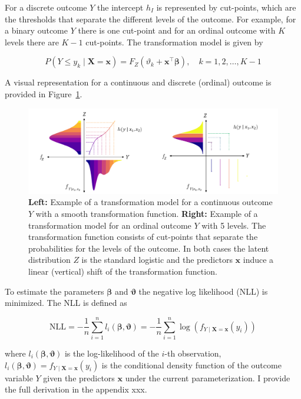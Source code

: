 For a discrete outcome $Y$ the intercept $h_I$ is represented by cut-points, which are the thresholds that separate the different levels of the outcome. For example, for a binary outcome $Y$ there is one cut-point and for an ordinal outcome with $K$ levels there are $K-1$ cut-points. The transformation model is given by

\begin{equation}
P(Y \leq y_k \mid \mathbf{X} = \mathbf{x}) = F_Z(\vartheta_k + \mathbf{x}^\top \boldsymbol{\beta}), \quad k = 1, 2, \ldots, K - 1
\end{equation}


A visual representation for a continuous and discrete (ordinal) outcome is provided in Figure~\ref{fig:tram_cont_ord}.


\begin{figure}[H]
\centering
\includegraphics[width=1\textwidth]{img/tram_cont_ord.png}
\caption{\textbf{Left:} Example of a transformation model for a continuous outcome $Y$ with a smooth transformation function. \textbf{Right:} Example of a transformation model for an ordinal outcome $Y$ with 5 levels. The transformation function consists of cut-points that separate the probabilities for the levels of the outcome.
In both cases the latent distribution $Z$ is the standard logistic and the predictors $\mathbf{x}$ induce a linear (vertical) shift of the transformation function.}
\label{fig:tram_cont_ord}
\end{figure}


To estimate the parameters $\boldsymbol{\beta}$ and $\boldsymbol{\vartheta}$ the negative log likelihood (NLL) is minimized. The NLL is defined as

\begin{equation}
\text{NLL} = - \frac{1}{n} \sum_{i=1}^{n} l_i(\boldsymbol{\beta}, \boldsymbol{\vartheta} ) = - \frac{1}{n} \sum_{i=1}^{n} \log (f_{Y \mid \mathbf{X} = \mathbf{x}}(y_i))
\label{eq:nll_tram}
\end{equation}

where $l_i(\boldsymbol{\beta}, \boldsymbol{\vartheta})$ is the log-likelihood of the $i$-th observation,  $l_i(\boldsymbol{\beta}, \boldsymbol{\vartheta}) = f_{Y \mid \mathbf{X} = \mathbf{x}}(y_i)$ is the conditional density function of the outcome variable $Y$ given the predictors $\mathbf{x}$ under the current parameterization. I provide the full derivation in the appendix xxx.


